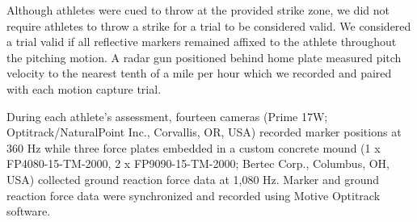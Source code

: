 \documentclass[
]{article}
\begin{document}
Although athletes were cued to throw at the provided strike zone, we did not require athletes to throw a strike for a trial to be considered valid. We considered a trial valid if all reflective markers remained affixed to the athlete throughout the pitching motion. A radar gun positioned behind home plate measured pitch velocity to the nearest tenth of a mile per hour which we recorded and paired with each motion capture trial.

During each athlete's assessment, fourteen cameras (Prime 17W; Optitrack/NaturalPoint Inc., Corvallis, OR, USA) recorded marker positions at 360 Hz while three force plates embedded in a custom concrete mound (1 x FP4080-15-TM-2000, 2 x FP9090-15-TM-2000; Bertec Corp., Columbus, OH, USA) collected ground reaction force data at 1,080 Hz. Marker and ground reaction force data were synchronized and recorded using Motive Optitrack software.
\end{document}
